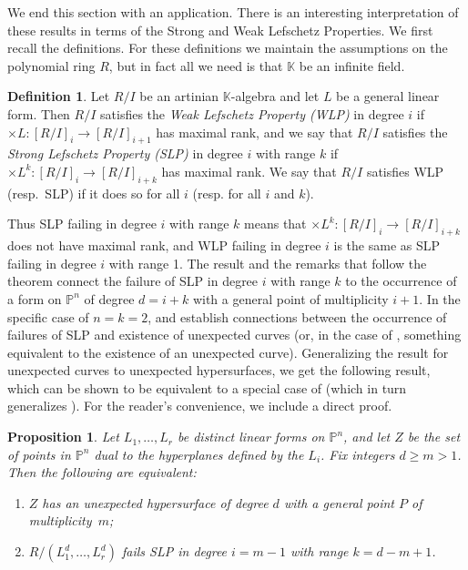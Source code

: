 \documentclass[12pt]{amsart}
\numberwithin{equation}{section}
\newtheorem{proposition}[theorem]{Proposition}
\theoremstyle{definition}
\newtheorem{definition}[theorem]{Definition}
\newcommand{\PP}{ \ensuremath{\mathbb{P}}}
\newcommand{\KK}{ \ensuremath{\mathbb{K}}}
\begin{document}
We end this section with an application.  There is an interesting interpretation of these results in terms of the Strong and Weak Lefschetz Properties. 
We first recall the definitions. For these definitions we maintain the assumptions on the polynomial ring $R$, but in fact all we need is that $\KK$ be an infinite field.

\begin{definition}
Let $R/I$ be an artinian $\KK$-algebra and let $L$ be a general linear form. Then $R/I$ satisfies the {\em Weak Lefschetz Property (WLP)} in 
degree $i$ if $\times L : [R/I]_i \rightarrow [R/I]_{i+1}$ has maximal rank, and we say that $R/I$ satisfies the {\em Strong Lefschetz Property 
(SLP)} in degree $i$ with range $k$ if $\times L^k : [R/I]_i \rightarrow [R/I]_{i+k}$ has maximal rank. We say that $R/I$ satisfies WLP (resp.\ SLP) if it does so for all $i$ (resp. for all $i$ and $k$). 
\end{definition}

Thus SLP failing in degree $i$ with range $k$ means that $\times L^k : [R/I]_i \rightarrow [R/I]_{i+k}$ does not 
have maximal rank, and WLP failing in degree $i$ is the same as SLP failing in degree $i$ with range 1.
The result \cite[Theorem 5.1]{DIV} and the remarks that follow the theorem connect the failure of SLP in degree $i$ with range $k$ to the occurrence of a form
on $\PP^n$ of degree $d=i+k$ with a general point of multiplicity $i+1$. In the specific case of $n=k=2$,
\cite[Theorem 7.5]{CHMN} and \cite[Proposition 16]{DI} establish connections between the occurrence
of failures of SLP and existence of unexpected curves (or, in the case of \cite{DI}, something equivalent to the existence of an unexpected curve).
Generalizing the result for unexpected curves to unexpected hypersurfaces, we get the following result, which can be shown to be equivalent to a 
special case  of \cite[Theorem 13]{DI} (which in turn generalizes \cite[Theorem 5.1]{DIV}).
For the reader's convenience, we include a direct proof.

\begin{proposition} \label{SLPvUH}
Let $L_1,\ldots, L_r$ be distinct linear forms on $\PP^n$, and let $Z$ be the set
of points in $\PP^n$ dual to the hyperplanes defined by the $L_i$. Fix integers $d\geq m>1$.
Then the following are equivalent:
\begin{enumerate}
\item[(a)] $Z$ has an unexpected hypersurface of degree $d$ with a general point $P$ of multiplicity~$m$;
\item[(b)] $R/(L_1^{d},\ldots, L_r^{d})$ fails SLP in degree $i=m-1$ with range $k=d-m+1$.
\end{enumerate}
\end{proposition}
\end{document}
